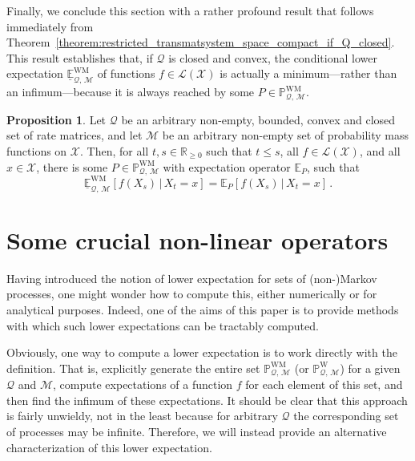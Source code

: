 \documentclass[10pt,a4paper]{paper}
\theoremstyle{definition}
\newtheorem{proposition}[theorem]{Proposition}
\newcommand{\reals}{\mathbb{R}}
\newcommand{\realsnonneg}{\reals_{\geq 0}}
\newcommand{\states}{\mathcal{X}}
\newcommand{\processes}{\mathbb{P}}
\newcommand{\wprocesses}{\processes^{\mathrm{W}}}
\newcommand{\wmprocesses}{\processes^{\mathrm{WM}}}
\newcommand{\gambles}{\mathcal{L}}
\newcommand{\gamblesX}{\gambles(\states)}
\newcommand{\rateset}{\mathcal{Q}}
\begin{document}
Finally, we conclude this section with a rather profound result that follows immediately from Theorem~\ref{theorem:restricted_transmatsystem_space_compact_if_Q_closed}. This result establishes that, if $\rateset$ is closed and convex, the conditional lower expectation $\underline{\mathbb{E}}_{\rateset,\,\mathcal{M}}^{\mathrm{WM}}$ of functions $f\in\gamblesX$ is actually a minimum---rather than an infimum---because it is always reached by some $P\in\wmprocesses_{\rateset,\,\mathcal{M}}$.
\begin{proposition}\label{prop:lower_expectation_reached_if_Q_closed}
Let $\rateset$ be an arbitrary non-empty, bounded, convex and closed set of rate matrices, and let $\mathcal{M}$ be an arbitrary non-empty set of probability mass functions on $\states$. Then, for all $t,s\in\realsnonneg$ such that $t\leq s$, all $f\in\gamblesX$, and all $x\in\states$, there is some $P\in\wmprocesses_{\rateset,\,\mathcal{M}}$ with expectation operator $\mathbb{E}_P$, such that
\begin{equation*}
\underline{\mathbb{E}}^{\mathrm{WM}}_{\rateset,\,\mathcal{M}}[f(X_s)\,\vert\,X_t=x] = \mathbb{E}_P[f(X_s)\,\vert\,X_t=x]\,.
\end{equation*}
\end{proposition}

\section{Some crucial non-linear operators}
\label{sec:lowertrans}

Having introduced the notion of lower expectation for sets of (non-)Markov processes, one might wonder how to compute this, either numerically or for analytical purposes. Indeed, one of the aims of this paper is to provide methods with which such lower expectations can be tractably computed.

Obviously, one way to compute a lower expectation is to work directly with the definition. That is, explicitly generate the entire set $\wmprocesses_{\rateset,\,\mathcal{M}}$ (or $\wprocesses_{\rateset,\,\mathcal{M}}$) for a given $\rateset$ and $\mathcal{M}$, compute expectations of a function $f$ for each element of this set, and then find the infimum of these expectations. It should be clear that this approach is fairly unwieldy, not in the least because for arbitrary $\rateset$ the corresponding set of processes may be infinite. Therefore, we will instead provide an alternative characterization of this lower expectation.
\end{document}
